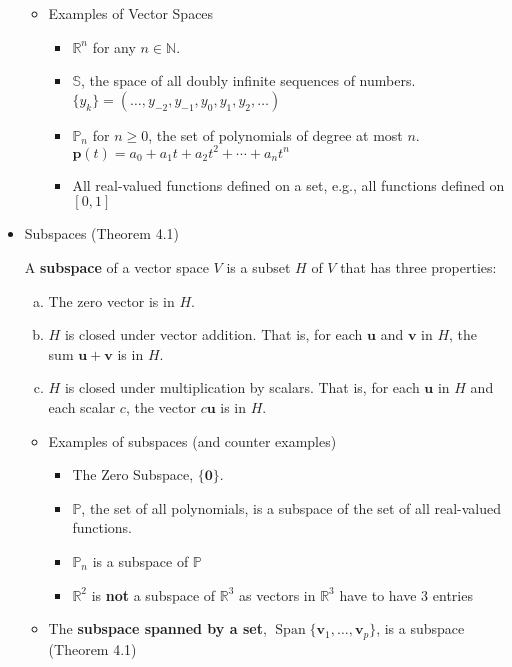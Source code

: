 \documentclass[10pt]{book}
\newenvironment{boxdef}{\begin{mdframed}[backgroundcolor=gray!30,linewidth=0pt,nobreak=true]}{\end{mdframed}}
\newcommand{\N}{\mathbb{N}}
\newcommand{\R}{\mathbb{R}}
\newcommand{\Poly}{\mathbb{P}}
\newcommand{\vect}[1]{\ensuremath{\boldsymbol{\mathbf{#1}}}}
\DeclareMathOperator{\Span}{Span}
\newcommand{\vectsetvp}{\{\vect{v}_1,\ldots,\vect{v}_p\}}
\begin{document}
\begin{itemize}
\begin{boxdef}
\begin{multicols}{3}
\begin{enumerate}
			\end{enumerate}
		\end{multicols}
	\end{boxdef}
	\begin{itemize}
		\item Examples of Vector Spaces
		\begin{itemize}
			\item $\R^n$ for any $n\in\N$.
			\item $\mathbb{S}$, the space of all doubly infinite sequences of numbers.
			$ \{y_k\} = (\ldots,y_{-2},y_{-1},y_0,y_1,y_2,\ldots) $
			\item $\Poly_n$ for $n\geq 0$, the set of polynomials of degree at most $n$.
			$ \vect{p}(t) = a_0 + a_1t + a_2t^2 + \cdots + a_nt^n $
			\item All real-valued functions defined on a set, e.g., all functions defined on $[0,1]$
		\end{itemize}
	\end{itemize}
	\item Subspaces (Theorem 4.1)
	\begin{boxdef}
		A \textbf{subspace} of a vector space $V$ is a subset $H$ of $V$ that has three properties:
		\begin{enumerate}[(a)]
			\item The zero vector is in $H$.
			\item $H$ is closed under vector addition. That is, for each $\vect{u}$ and $\vect{v}$ in $H$, the sum $\vect{u}+\vect{v}$ is in $H$.
			\item $H$ is closed under multiplication by scalars. That is, for each $\vect{u}$ in $H$ and each scalar $c$, the vector $c\vect{u}$ is in $H$.
		\end{enumerate}
	\end{boxdef}
	\begin{itemize}
		\item Examples of subspaces (and counter examples)
		\begin{itemize}
			\item The Zero Subspace, $\{\vect{0}\}$.
			\item $\Poly$, the set of all polynomials, is a subspace of the set of all real-valued functions.
			\item $\Poly_n$ is a subspace of $\Poly$
			\item $\R^2$ is \textbf{not} a subspace of $\R^3$ as vectors in $\R^3$ have to have 3 entries
		\end{itemize}
		\item The \textbf{subspace spanned by a set}, $\Span\vectsetvp$, is a subspace (Theorem 4.1)
	\end{itemize}
\end{itemize}
\end{document}
